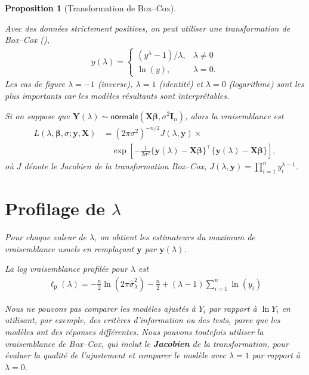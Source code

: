 \documentclass[
  11pt,
  letterpaper,
]{scrbook}
\theoremstyle{plain}
\newtheorem{proposition}{Proposition}[chapter]
\theoremstyle{definition}
\theoremstyle{plain}
\theoremstyle{definition}
\theoremstyle{remark}
\begin{document}
\begin{proposition}[Transformation de
Box--Cox]\protect\hypertarget{prp-boxcox}{}\label{prp-boxcox}

Avec des données strictement positives, on peut utiliser une
transformation de Box--Cox (), \begin{align*}
y(\lambda)= \begin{cases}
(y^{\lambda}-1)/\lambda, & \lambda \neq 0\\
\ln(y), & \lambda=0.
\end{cases}
\end{align*} Les cas de figure \(\lambda=-1\) (inverse), \(\lambda=1\)
(identité) et \(\lambda=0\) (logarithme) sont les plus importants car
les modèles résultants sont interprétables.

Si on suppose que
\(\boldsymbol{Y}(\lambda) \sim \mathsf{normale}(\mathbf{X}\boldsymbol{\beta}, \sigma^2 \mathbf{I}_n)\),
alors la vraisemblance est \begin{align*}
L(\lambda, \boldsymbol{\beta}, \sigma; \boldsymbol{y}, \mathbf{X}) &= (2\pi\sigma^2)^{-n/2} J(\lambda, \boldsymbol{y}) \times\\& \quad \exp \left[ - \frac{1}{2\sigma^2}\{\boldsymbol{y}(\lambda) - \mathbf{X}\boldsymbol{\beta}\}^\top\{\boldsymbol{y}(\lambda) - \mathbf{X}\boldsymbol{\beta}\}\right],
\end{align*} où \(J\) dénote le Jacobien de la transformation Box--Cox,
\(J(\lambda, \boldsymbol{y})=\prod_{i=1}^n y_i^{\lambda-1}\).

\section{\texorpdfstring{Profilage de
\(\lambda\)}{Profilage de \textbackslash lambda}}\label{profilage-de-lambda}

Pour chaque valeur de \(\lambda\), on obtient les estimateurs du maximum
de vraisemblance usuels en remplaçant \(\boldsymbol{y}\) par
\(\boldsymbol{y}(\lambda)\).

La log vraisemblance profilée pour \(\lambda\) est \begin{align*}
\ell_{\mathsf{p}}(\lambda) = -\frac{n}{2}\ln(2\pi \widehat{\sigma}^2_\lambda) - \frac{n}{2} + (\lambda - 1)\sum_{i=1}^n \ln(y_i)
\end{align*}

Nous ne pouvons pas comparer les modèles ajustés à \(Y_i\) par rapport à
\(\ln Y_i\) en utilisant, par exemple, des critères d'information ou des
tests, parce que les modèles ont des réponses différentes. Nous pouvons
toutefois utiliser la vraisemblance de Box--Cox, qui inclut le
\textbf{Jacobien} de la transformation, pour évaluer la qualité de
l'ajustement et comparer le modèle avec \(\lambda=1\) par rapport à
\(\lambda=0\).


\end{proposition}
\end{document}
